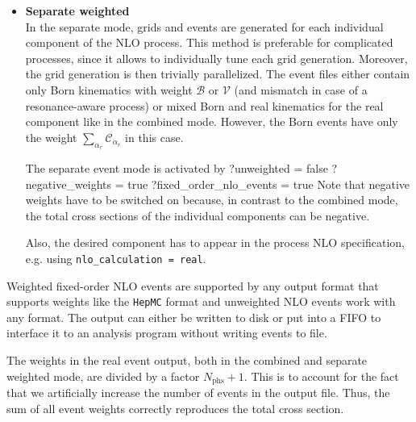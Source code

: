 \documentclass[12pt]{book}
\newenvironment{code}%
  {\begingroup\footnotesize
   \quote
   \Verbatim}%
  {\endVerbatim
   \endquote
   \endgroup\noindent}
\newcommand{\ttt}[1]{\texttt{#1}}
\begin{document}
\begin{itemize}
  \item \textbf{Separate weighted}\\
    In the separate mode, grids and events are generated for each
    individual component of the NLO process. This method is preferable
    for complicated processes, since it allows to individually tune each
    grid generation. Moreover, the grid generation is then trivially
    parallelized.  The event files either contain only Born
    kinematics with weight $\mathcal{B}$ or $\mathcal{V}$ (and mismatch
    in case of a resonance-aware process) or mixed Born and real
    kinematics for the real component like in the combined mode.
    However, the Born events have only the weight $\sum_{\alpha_r}
    \mathcal{C}_{\alpha_r}$ in this case.

    The separate event mode is activated by
    \begin{code}
      ?unweighted = false
      ?negative_weights = true
      ?fixed_order_nlo_events = true
    \end{code}
    Note that negative weights have to be switched on because, in contrast
    to the combined mode, the total cross sections of the individual
    components can be negative.

    Also, the desired component has to appear in the process NLO
    specification, e.g. using \ttt{nlo\_calculation = real}.
\end{itemize}
Weighted fixed-order NLO events are supported by any output format that
supports weights like the \ttt{HepMC} format and unweighted NLO events
work with any format. The output can either be written to disk or put
into a FIFO to interface it to an analysis program without writing
events to file.

The weights in the real event output, both in the combined and separate
weighted mode, are divided by a factor $N_{\text{phs}} + 1$. This
is to account for the fact that we artificially increase the number of
events in the output file.  Thus, the sum of all event weights correctly
reproduces the total cross section.
\end{document}
